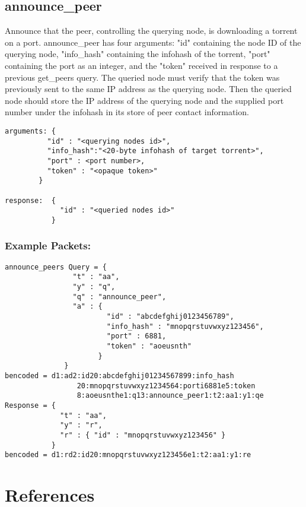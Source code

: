 \documentclass{article}
\begin{document}
{\subsection {announce\_peer}}

Announce that the peer, controlling the querying node, is downloading a torrent on a port. announce\_peer has four arguments: "id" containing the node ID of the querying node, "info\_hash" containing the infohash of the torrent, "port" containing the port as an integer, and the "token" received in response to a previous get\_peers query. The queried node must verify that the token was previously sent to the same IP address as the querying node. Then the queried node should store the IP address of the querying node and the supplied port number under the infohash in its store of peer contact information.

\begin{verbatim}
arguments: {
          "id" : "<querying nodes id>",
          "info_hash":"<20-byte infohash of target torrent>",
          "port" : <port number>,
          "token" : "<opaque token>"
        }

response:  {
             "id" : "<queried nodes id>"
           }
\end{verbatim}


{\subsubsection{Example Packets:}}

\begin{verbatim}
announce_peers Query = {
                "t" : "aa",
                "y" : "q",
                "q" : "announce_peer",
                "a" : {
                        "id" : "abcdefghij0123456789",
                        "info_hash" : "mnopqrstuvwxyz123456",
                        "port" : 6881,
                        "token" : "aoeusnth"
                      }
              }
bencoded = d1:ad2:id20:abcdefghij01234567899:info_hash
                 20:mnopqrstuvwxyz1234564:porti6881e5:token
                 8:aoeusnthe1:q13:announce_peer1:t2:aa1:y1:qe
Response = {
             "t" : "aa",
             "y" : "r",
             "r" : { "id" : "mnopqrstuvwxyz123456" }
           }
bencoded = d1:rd2:id20:mnopqrstuvwxyz123456e1:t2:aa1:y1:re
\end{verbatim}

{\section {References}}
\end{document}
